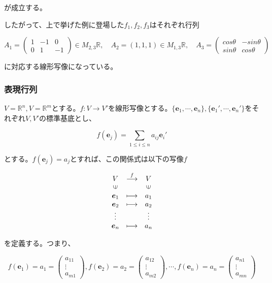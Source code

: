 \documentclass[dvipdfmx,autodetect-engine]{jsarticle}
\newcommand{\vecSet}[1]{\mathbb{R}^{#1}}
\begin{document}
が成立する。

したがって、上で挙げた例に登場した$f_1, f_2, f_3$はそれぞれ行列

$$
A_1 = \begin{pmatrix}
1 & -1 & 0 \\
0 & 1 & -1
\end{pmatrix} \in M_{2,3}\mathbb{R}, \quad
A_2 = (1, 1, 1) \in M_{1,3}\mathbb{R}, \quad
A_3 = \begin{pmatrix}
cos\theta & -sin\theta \\
sin\theta & cos\theta
\end{pmatrix}
$$

に対応する線形写像になっている。

\subsubsection{表現行列}

$V = \vecSet{n}, V = \vecSet{m}$とする。$f: V \to V'$を線形写像とする。$\{\bm{e}_1, \cdots, \bm{e}_n\}, \{\bm{e}_1', \cdots, \bm{e}_n'\}$をそれぞれ$V, V'$の標準基底とし、

$$
f(\bm{e}_j) = \sum_{1 \leq i \leq n} a_{ij}\bm{e}_{i}'
$$

とする。$f(\bm{e}_j) = a_j$とすれば、この関係式は以下の写像$f$

$$
\begin{array}{ccc}
V & \stackrel{f}{\longrightarrow}  & V \\
\rotatebox{90}{$\in$} & & \rotatebox{90}{$\in$} \\
\bm{e}_1 & \longmapsto & a_1 \\
\bm{e}_2 & \longmapsto & a_2 \\
\vdots & & \vdots \\
\bm{e}_n & \longmapsto & a_n
\end{array}
$$

を定義する。つまり、

$$
f(\bm{e}_1) = a_1 = \begin{pmatrix}
a_{11} \\
\vdots \\
a_{m1}
\end{pmatrix}, 
f(\bm{e}_2) = a_2 = \begin{pmatrix}
a_{12} \\
\vdots \\
a_{m2}
\end{pmatrix}, 
\cdots,
f(\bm{e}_n) = a_n = \begin{pmatrix}
a_{n1} \\
\vdots \\
a_{mn}
\end{pmatrix}
$$
\end{document}
